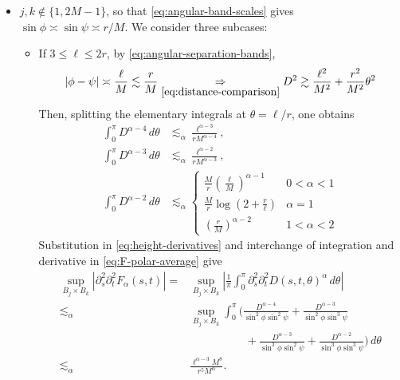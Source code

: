 \documentclass[11pt]{amsart}
\begin{document}
\begin{itemize}
\item $j,k\not\in\{1,2M-1\}$, so that \eqref{eq:angular-band-scales} gives
$\sin\phi\asymp\sin\psi\asymp r/M$. We consider three subcases:
\begin{itemize}
    \item[$\star$] If $3\le\ell\le  2r$, by \eqref{eq:angular-separation-bands},
\[
 |\phi-\psi|\asymp\frac\ell M\lesssim \frac{r}{M}\underset{\eqref{eq:distance-comparison}}{\Rightarrow} D^2\gtrsim\frac{\ell^2}{M^2}+\frac{r^2}{M^2}\theta^2
\]
Then,
splitting the elementary integrals at $\theta=\ell/r$, one obtains
\begin{align*}
 \int_0^\pi D^{\alpha-4}\,d\theta
 &\lesssim_\alpha \frac{\ell^{\alpha-3}}{rM^{\alpha-4}},\\
 \int_0^\pi D^{\alpha-3}\,d\theta
 &\lesssim_\alpha \frac{\ell^{\alpha-2}}{rM^{\alpha-3}},\\
 \int_0^\pi D^{\alpha-2}\,d\theta
 &\lesssim_\alpha\begin{cases}
 \frac{M}{r}\left(\frac{\ell}{M}\right)^{\alpha-1}&0<\alpha<1\\
 \frac{M}{r}\log\left(2+\frac{r}{\ell}\right)&\alpha=1\\
 \left(\frac{r}{M}\right)^{\alpha-2}&1<\alpha<2
 \end{cases}
\end{align*}
Substitution in \eqref{eq:height-derivatives} and interchange of
integration and derivative in \eqref{eq:F-polar-average} give
\begin{align}\label{eq:local-mixed-derivative}
 \sup_{B_j\times B_k}
 |\partial_s^2\partial_t^2F_\alpha(s,t)|=&\sup_{B_j\times B_k}\left|\frac1\pi\int_0^\pi \partial_s^2\partial_t^2D(s,t,\theta)^\alpha \,d\theta\right|
  \\
  \lesssim_\alpha&
  \sup_{B_j\times B_k}\int_0^\pi\Biggl(
  \frac{D^{\alpha-4}}{\sin^2\phi\sin^2\psi}
  +\frac{D^{\alpha-3}}{\sin^2\phi\sin^3\psi}\nonumber\\
  &\qquad\qquad\quad
  +\frac{D^{\alpha-3}}{\sin^3\phi\sin^2\psi}
  +\frac{D^{\alpha-2}}{\sin^3\phi\sin^3\psi}
  \Biggr)\,d\theta\nonumber\\
  \lesssim_{\alpha}& \frac{\ell^{\alpha-3}M^8}{r^5M^\alpha}\nonumber.
\end{align}

\end{itemize}
\end{itemize}
\end{document}
